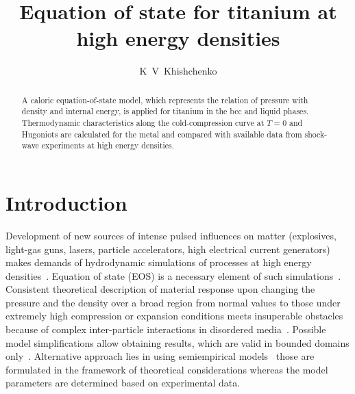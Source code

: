 \documentclass[a4paper]{jpconf}
\begin{document}
\title{Equation of state for titanium at high energy densities}

\author{K~V~Khishchenko}

\address{Joint Institute for High Temperatures of the Russian Acad\-emy of Sciences, Izhorskaya 13 Bldg~2, Moscow 125412, Russia}


\begin{abstract}
A caloric equation-of-state model, which represents the relation of pressure with density and internal energy, is applied for titanium in the bcc and liquid phases. Thermodynamic characteristics along the cold-compression curve at $T=0$ and Hugoniots are calculated for the metal and compared with available data from shock-wave experiments at high energy densities.
\end{abstract}

\section{Introduction}
Development of new sources of intense pulsed influences on matter (explosives, light-gas guns, lasers, particle accelerators, high electrical current generators) makes demands of hydrodynamic simulations of processes at high energy densities~\cite{Bushman-Fortov-Kanel-Ni-1993, Agureikin-Anisimov-Bushman-Kanel-Karyagin-Konstantinov-Kryukov-Minin-Razorenov-Sagdeev-Sugak-Fortov-HT-1984, Fortov-Kim-Lomonosov-Matveichev-Ostrik-IJImpEng-2006, Povarnitsyn-Khishchenko-Levashov-IJImpEng-2006, Tkachenko-Levashov-Khishchenko-JPA-2006, Oreshkin-Khishchenko-Levashov-Rousskikh-Chaikovskii-HT-2012, Inogamov-Zhakhovsky-Petrov-Khokhlov-Ashitkov-Khishchenko-Migdal-Ilnitsky-Emirov-Komarov-Shepelev-Miller-Oleynik-Agranat-Andriyash-Anisimov-Fortov-CPP-2013, Andreev-Povarnitsyn-Veysman-Faenov-Levashov-Khishchenko-Pikuz-Magunov-Rosmej-Blazevic-Pelka-Schaumann-Schollmeier-Roth-LPB-2015, Senchenko-Belikov-Popov-2015, Mayer-2015, Gnyusov-Rotshtein-Mayer-Rostov-Gunin-Khishchenko-Levashov-2016, Krasyuk-Pashinin-Semenov-Khishchenko-Fortov-2016}. Equation of state (EOS) is a necessary element of such simulations~\cite{Bushman-Fortov-Kanel-Ni-1993}. Consistent theoretical description of material response upon changing the pressure and the density over a broad region from normal values to those under extremely high compression or expansion conditions meets insuperable obstacles because of complex inter-particle interactions in disordered media~\cite{Bushman-Fortov-1983}. Possible model simplifications allow obtaining results, which are valid in bounded domains only~\cite{Levashov-Sinko-Smirnov-Minakov-Shemyakin-Khishchenko-JPCM-2010, Shpatakovskaya-2012, Sinko-Smirnov-Ovechkin-Levashov-Khishchenko-HEDP-2013, Dyachkov-Levashov-2014, Minakov-Levashov-Khishchenko-Fortov-JAP-2014, Kadatskiy-Khishchenko-JPCS-2015}. Alternative approach lies in using semiempirical models~\cite{Zeldovich-Raizer-1967, Fortov-Lomonosov-PhysUsp-2014} those are formulated in the framework of theoretical considerations whereas the model parameters are determined based on experimental data.
\end{document}
